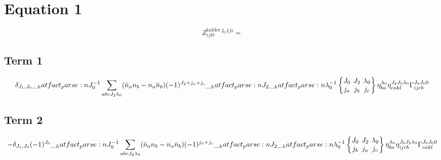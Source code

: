 \documentclass{scrartcl}
\newcommand{\sixj}[6]{\begingroup\setlength{\arraycolsep}{0.2em}\begin{Bmatrix} #1 & #2 & #3 \\ #4 & #5 & #6 \end{Bmatrix}\endgroup}
\begin{document}
\section{Equation 1}
\begin{dmath*}
Z^{\mathrm{ladder}}_{i j k l}^{{J}_{0} {J}_{1} 0} = 
\end{dmath*}
\subsection{Term 1}
\begin{dmath*}
\delta_{{J}_{1},{J}_{0}} \* \hatfact{{J}_{0}^{-1}} \* \sum_{a b c {J}_{2} {{\lambda}}_{0}} \* (\bar{n}_{a} \* n_{b} -n_{a} \* \bar{n}_{b}) \* (-1)^{{J}_{2}+{j}_{a}+{j}_{c}} \* \hatfact{{J}_{2}} \* \hatfact{{{\lambda}}_{0}^{-1}} \* \sixj{{J}_{0}}{{J}_{2}}{{{\lambda}}_{0}}{{j}_{a}}{{j}_{b}}{{j}_{c}} \* \eta_{b a}^{{{\lambda}}_{0}} \* \eta_{c a k l}^{{J}_{2} {J}_{0} {{\lambda}}_{0}} \* \Gamma_{i j c b}^{{J}_{0} {J}_{0} 0}
\end{dmath*}
\subsection{Term 2}
\begin{dmath*}
-\delta_{{J}_{1},{J}_{0}} \* (-1)^{{J}_{0}} \* \hatfact{{J}_{0}^{-1}} \* \sum_{a b c {J}_{2} {{\lambda}}_{0}} \* (\bar{n}_{a} \* n_{b} -n_{a} \* \bar{n}_{b}) \* (-1)^{{j}_{a}+{j}_{c}} \* \hatfact{{J}_{2}} \* \hatfact{{{\lambda}}_{0}^{-1}} \* \sixj{{J}_{0}}{{J}_{2}}{{{\lambda}}_{0}}{{j}_{b}}{{j}_{a}}{{j}_{c}} \* \eta_{b a}^{{{\lambda}}_{0}} \* \eta_{i j c b}^{{J}_{0} {J}_{2} {{\lambda}}_{0}} \* \Gamma_{c a k l}^{{J}_{0} {J}_{0} 0}
\end{dmath*}
\end{document}
